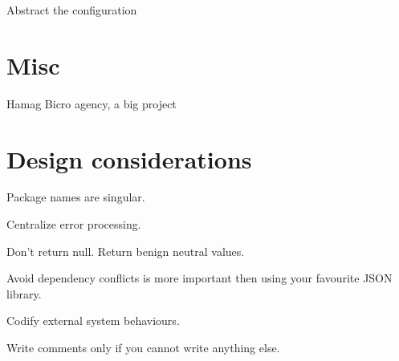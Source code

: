 \documentclass{article}
\begin{document}
Abstract the configuration

\section{Misc}

Hamag Bicro agency, a big project

\section{Design considerations}

Package names are singular.

Centralize error processing.

Don't return null. Return benign neutral values.

Avoid dependency conflicts is more important then using your favourite JSON library.

Codify external system behaviours.

Write comments only if you cannot write anything else.
\end{document}
